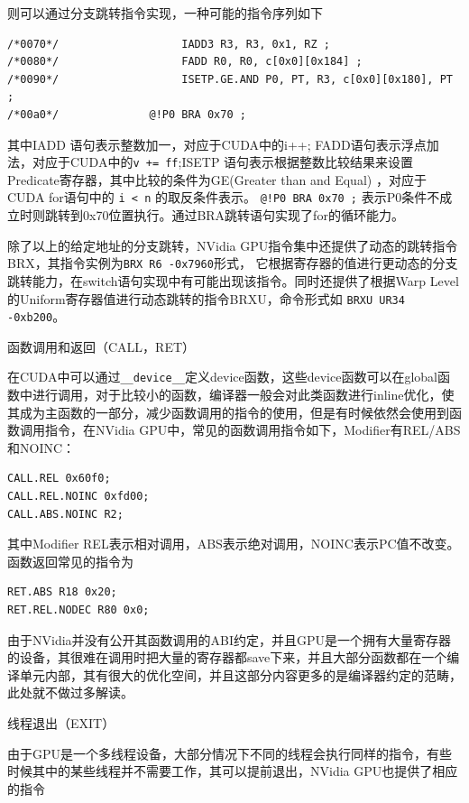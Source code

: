 则可以通过分支跳转指令实现，一种可能的指令序列如下

\begin{lstlisting}
/*0070*/                   IADD3 R3, R3, 0x1, RZ ;
/*0080*/                   FADD R0, R0, c[0x0][0x184] ;
/*0090*/                   ISETP.GE.AND P0, PT, R3, c[0x0][0x180], PT ;
/*00a0*/              @!P0 BRA 0x70 ;
\end{lstlisting}

其中IADD 语句表示整数加一，对应于CUDA中的i++; FADD语句表示浮点加法，对应于CUDA中的\lstinline|v += ff|;ISETP 语句表示根据整数比较结果来设置Predicate寄存器，其中比较的条件为GE(Greater than and Equal) ，对应于CUDA for语句中的 \lstinline|i < n| 的取反条件表示。 \lstinline|@!P0 BRA 0x70 ;| 表示P0条件不成立时则跳转到0x70位置执行。通过BRA跳转语句实现了for的循环能力。

除了以上的给定地址的分支跳转，NVidia GPU指令集中还提供了动态的跳转指令BRX，其指令实例为\lstinline|BRX R6 -0x7960|形式， 它根据寄存器的值进行更动态的分支跳转能力，在switch语句实现中有可能出现该指令。同时还提供了根据Warp Level的Uniform寄存器值进行动态跳转的指令BRXU，命令形式如 \lstinline|BRXU UR34 -0xb200|。

函数调用和返回（CALL，RET）

在CUDA中可以通过\lstinline|__device__|定义device函数，这些device函数可以在global函数中进行调用，对于比较小的函数，编译器一般会对此类函数进行inline优化，使其成为主函数的一部分，减少函数调用的指令的使用，但是有时候依然会使用到函数调用指令，在NVidia GPU中，常见的函数调用指令如下，Modifier有REL/ABS和NOINC：

\begin{lstlisting}
CALL.REL 0x60f0;
CALL.REL.NOINC 0xfd00;
CALL.ABS.NOINC R2;
\end{lstlisting}

其中Modifier REL表示相对调用，ABS表示绝对调用，NOINC表示PC值不改变。函数返回常见的指令为

\begin{lstlisting}
RET.ABS R18 0x20;
RET.REL.NODEC R80 0x0;
\end{lstlisting}

由于NVidia并没有公开其函数调用的ABI约定，并且GPU是一个拥有大量寄存器的设备，其很难在调用时把大量的寄存器都save下来，并且大部分函数都在一个编译单元内部，其有很大的优化空间，并且这部分内容更多的是编译器约定的范畴，此处就不做过多解读。

线程退出（EXIT）

由于GPU是一个多线程设备，大部分情况下不同的线程会执行同样的指令，有些时候其中的某些线程并不需要工作，其可以提前退出，NVidia GPU也提供了相应的指令

